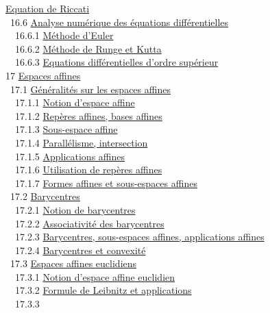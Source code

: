 \documentclass[]{article}
\begin{document}
\href{coursse90.html\#x109-50300016.5.8}{Equation de Riccati} \\ ~16.6
\href{coursse91.html\#x110-50400016.6}{Analyse numérique des équations
différentielles} \\ ~~16.6.1
\href{coursse91.html\#x110-50500016.6.1}{Méthode d'Euler} \\ ~~16.6.2
\href{coursse91.html\#x110-50600016.6.2}{Méthode de Runge et Kutta} \\
~~16.6.3 \href{coursse91.html\#x110-50700016.6.3}{Equations
différentielles d'ordre supérieur} \\ 17
\href{coursch18.html\#x111-50800017}{Espaces affines} \\ ~17.1
\href{coursse92.html\#x112-50900017.1}{Généralités sur les espaces
affines} \\ ~~17.1.1 \href{coursse92.html\#x112-51000017.1.1}{Notion
d'espace affine} \\ ~~17.1.2
\href{coursse92.html\#x112-51100017.1.2}{Repères affines, bases affines}
\\ ~~17.1.3 \href{coursse92.html\#x112-51200017.1.3}{Sous-espace affine}
\\ ~~17.1.4 \href{coursse92.html\#x112-51300017.1.4}{Parallélisme,
intersection} \\ ~~17.1.5
\href{coursse92.html\#x112-51400017.1.5}{Applications affines} \\
~~17.1.6 \href{coursse92.html\#x112-51500017.1.6}{Utilisation de repères
affines} \\ ~~17.1.7 \href{coursse92.html\#x112-51600017.1.7}{Formes
affines et sous-espaces affines} \\ ~17.2
\href{coursse93.html\#x113-51700017.2}{Barycentres} \\ ~~17.2.1
\href{coursse93.html\#x113-51800017.2.1}{Notion de barycentres} \\
~~17.2.2 \href{coursse93.html\#x113-51900017.2.2}{Associativité des
barycentres} \\ ~~17.2.3
\href{coursse93.html\#x113-52000017.2.3}{Barycentres, sous-espaces
affines, applications affines} \\ ~~17.2.4
\href{coursse93.html\#x113-52100017.2.4}{Barycentres et convexité} \\
~17.3 \href{coursse94.html\#x114-52200017.3}{Espaces affines euclidiens}
\\ ~~17.3.1 \href{coursse94.html\#x114-52300017.3.1}{Notion d'espace
affine euclidien} \\ ~~17.3.2
\href{coursse94.html\#x114-52400017.3.2}{Formule de Leibnitz et
applications} \\ ~~17.3.3
\end{document}
